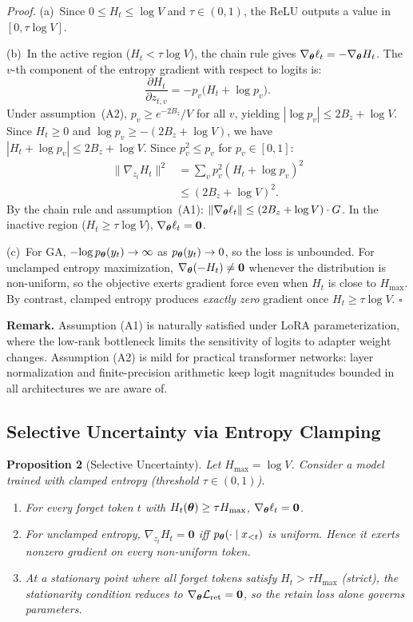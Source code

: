 \noindent\textit{Proof.}
(a)~Since $0 \leq H_t \leq \log V$ and $\tau \in (0,1)$, the ReLU outputs a value in $[0, \tau \log V]$.

(b)~In the active region ($H_t < \tau \log V$), the chain rule gives $\nabla_{\boldsymbol{\theta}} \ell_t = -\nabla_{\boldsymbol{\theta}} H_t$.
The $v$-th component of the entropy gradient with respect to logits is:
\[
\frac{\partial H_t}{\partial z_{t,v}} = -p_v\bigl(H_t + \log p_v\bigr).
\]
Under assumption~(A2), $p_v \geq e^{-2B_z}/V$ for all $v$, yielding $|\!\log p_v| \leq 2B_z + \log V$.
Since $H_t \geq 0$ and $\log p_v \geq -(2B_z + \log V)$, we have $|H_t + \log p_v| \leq 2B_z + \log V$.
Since $p_v^2 \leq p_v$ for $p_v \in [0,1]$:
\begin{align*}
\lVert \nabla_{z_t} H_t \rVert^2 &= \sum_v p_v^2 (H_t + \log p_v)^2 \\
&\leq (2B_z + \log V)^2.
\end{align*}
By the chain rule and assumption~(A1):
$\lVert \nabla_{\boldsymbol{\theta}} \ell_t \rVert \leq (2B_z + \log V) \cdot G$.
In the inactive region ($H_t \geq \tau \log V$), $\nabla_{\boldsymbol{\theta}} \ell_t = \mathbf{0}$.

(c)~For GA, $-\!\log p_{\boldsymbol{\theta}}(y_t) \to \infty$ as $p_{\boldsymbol{\theta}}(y_t) \to 0$, so the loss is unbounded.
For unclamped entropy maximization, $\nabla_{\boldsymbol{\theta}}(-H_t) \neq \mathbf{0}$ whenever the distribution is non-uniform, so the objective exerts gradient force even when $H_t$ is close to $H_\mathrm{max}$.
By contrast, clamped entropy produces \emph{exactly zero} gradient once $H_t \geq \tau \log V$.
\hfill$\square$

\smallskip
\noindent\textbf{Remark.}
Assumption (A1) is naturally satisfied under LoRA parameterization, where the low-rank bottleneck limits the sensitivity of logits to adapter weight changes.
Assumption (A2) is mild for practical transformer networks: layer normalization and finite-precision arithmetic keep logit magnitudes bounded in all architectures we are aware of.


\subsection{Selective Uncertainty via Entropy Clamping}
\label{app:selective}

\medskip
\noindent\textbf{Proposition 2} (Selective Uncertainty).
\textit{Let $H_{\max} = \log V$. Consider a model trained with clamped entropy (threshold $\tau \in (0,1)$).}
\begin{enumerate}
\item[(a)] \textit{For every forget token $t$ with $H_t(\boldsymbol{\theta}) \geq \tau H_{\max}$, $\nabla_{\boldsymbol{\theta}} \ell_t = \mathbf{0}$.}
\item[(b)] \textit{For unclamped entropy, $\nabla_{z_t} H_t = \mathbf{0}$ iff $p_{\boldsymbol{\theta}}(\cdot \mid x_{<t})$ is uniform. Hence it exerts nonzero gradient on every non-uniform token.}
\item[(c)] \textit{At a stationary point where all forget tokens satisfy $H_t > \tau H_{\max}$ (strict), the stationarity condition reduces to $\nabla_{\boldsymbol{\theta}} \mathcal{L}_\mathrm{ret} = \mathbf{0}$, so the retain loss alone governs parameters.}
\end{enumerate}

